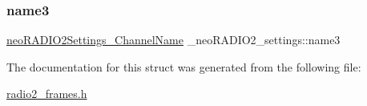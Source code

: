 \mbox{\label{struct__neo_r_a_d_i_o2__settings_a575809bc427a39067f3ba1f2c9d1c180}} 
\subsubsection{\texorpdfstring{name3}{name3}}
{\footnotesize\ttfamily \mbox{\hyperlink{radio2__frames_8h_a1408425073c1e67e3acadd20d943aa60}{neo\+R\+A\+D\+I\+O2\+Settings\+\_\+\+Channel\+Name}} \+\_\+neo\+R\+A\+D\+I\+O2\+\_\+settings\+::name3}



The documentation for this struct was generated from the following file\+:\begin{DoxyCompactItemize}
\item 
\mbox{\hyperlink{radio2__frames_8h}{radio2\+\_\+frames.\+h}}\end{DoxyCompactItemize}
